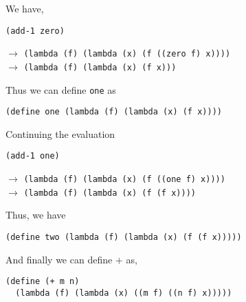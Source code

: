 \documentclass[a4paper,12pt]{article}
\begin{document}
We have,
\begin{lstlisting}
(add-1 zero)
\end{lstlisting}
$\rightarrow$ \lstinline!(lambda (f) (lambda (x) (f ((zero f) x))))! \\
$\rightarrow$ \lstinline!(lambda (f) (lambda (x) (f x)))!

\medskip
Thus we can define \lstinline!one! as
\begin{lstlisting}
(define one (lambda (f) (lambda (x) (f x))))
\end{lstlisting}
Continuing the evaluation
\begin{lstlisting}
(add-1 one)
\end{lstlisting}
$\rightarrow$ \lstinline!(lambda (f) (lambda (x) (f ((one f) x))))! \\
$\rightarrow$ \lstinline!(lambda (f) (lambda (x) (f (f x))))!

\medskip
Thus, we have
\begin{lstlisting}
(define two (lambda (f) (lambda (x) (f (f x)))))
\end{lstlisting}
And finally we can define $+$ as,
\begin{lstlisting}
(define (+ m n)
  (lambda (f) (lambda (x) ((m f) ((n f) x)))))
\end{lstlisting}
\end{document}
